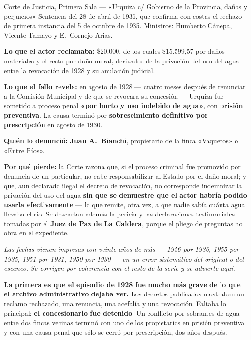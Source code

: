 \begin{ficha}{Corte de Justicia, Primera Sala --- «Urquiza c/ Gobierno de la Provincia, daños y perjuicios»}
Sentencia del 28 de abril de 1936, que confirma con costas el rechazo de primera instancia
del 5 de octubre de 1935. Ministros: Humberto Cánepa, Vicente Tamayo y E.\ Cornejo Arias.

\textbf{Lo que el actor reclamaba:} \$20.000, de los cuales \$15.599,57 por daños materiales
y el resto por daño moral, derivados de la privación del uso del agua entre la revocación de
1928 y su anulación judicial.

\textbf{Lo que el fallo revela:} en agosto de 1928 --- cuatro meses después de renunciar a la
Comisión Municipal y de que se revocara su concesión --- Urquiza fue sometido a proceso penal
\textbf{«por hurto y uso indebido de agua»}, con \textbf{prisión preventiva}. La causa
terminó por \textbf{sobreseimiento definitivo por prescripción} en agosto de 1930.

\textbf{Quién lo denunció:} \textbf{Juan A.\ Bianchi}, propietario de la finca «Vaqueros» o
«Entre Ríos».

\textbf{Por qué pierde:} la Corte razona que, si el proceso criminal fue promovido por
denuncia de un particular, no cabe responsabilizar al Estado por el daño moral; y que, aun
declarado ilegal el decreto de revocación, no corresponde indemnizar la privación del uso del
agua \textbf{sin que se demuestre que el actor habría podido usarla efectivamente} --- lo que
remite, otra vez, a que nadie sabía cuánta agua llevaba el río. Se descartan además la pericia
y las declaraciones testimoniales tomadas por el \textbf{Juez de Paz de La Caldera}, porque el
pliego de preguntas no obra en el expediente.

\textit{Las fechas vienen impresas con veinte años de más --- 1956 por 1936, 1955 por 1935,
1951 por 1931, 1950 por 1930 --- en un error sistemático del original o del escaneo. Se
corrigen por coherencia con el resto de la serie y se advierte aquí.}
\end{ficha}

\textbf{La primera es que el episodio de 1928 fue mucho más grave de lo que el archivo
administrativo dejaba ver.} Los decretos publicados mostraban un reclamo rechazado, una
renuncia, una acefalía y una revocación. Faltaba lo principal: \textbf{el concesionario fue
detenido}. Un conflicto por sobrantes de agua entre dos fincas vecinas terminó con uno de los
propietarios en prisión preventiva y con una causa penal que sólo se cerró por prescripción,
dos años después.

